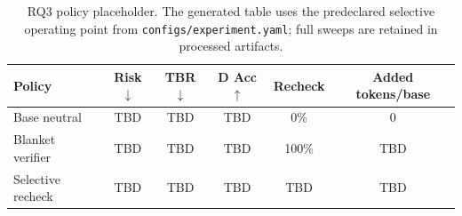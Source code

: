 \begin{table}[t]
\centering
\small
\begin{tabular}{@{}lccccc@{}}
\toprule
Policy & Risk$\downarrow$ & TBR$\downarrow$ & D Acc$\uparrow$ & Recheck & Added tokens/base \\
\midrule
Base neutral & TBD & TBD & TBD & 0\% & 0 \\
Blanket verifier & TBD & TBD & TBD & 100\% & TBD \\
Selective recheck & TBD & TBD & TBD & TBD & TBD \\
\bottomrule
\end{tabular}
\caption{RQ3 policy placeholder. The generated table uses the predeclared selective operating point from \texttt{configs/experiment.yaml}; full sweeps are retained in processed artifacts.}
\label{tab:rq3}
\end{table}
